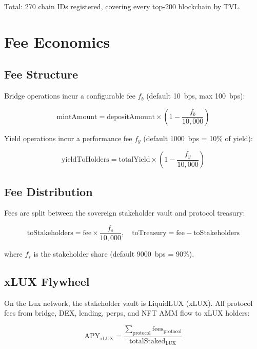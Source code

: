 \documentclass[11pt,twocolumn]{article}
\begin{document}
Total: 270 chain IDs registered, covering every top-200 blockchain by TVL.

\section{Fee Economics}

\subsection{Fee Structure}

Bridge operations incur a configurable fee $f_b$ (default 10~bps, max 100~bps):

\begin{equation}
  \text{mintAmount} = \text{depositAmount} \times \left(1 - \frac{f_b}{10{,}000}\right)
\end{equation}

Yield operations incur a performance fee $f_y$ (default 1000~bps = 10\% of yield):

\begin{equation}
  \text{yieldToHolders} = \text{totalYield} \times \left(1 - \frac{f_y}{10{,}000}\right)
\end{equation}

\subsection{Fee Distribution}

Fees are split between the sovereign stakeholder vault and protocol treasury:

\begin{equation}
  \text{toStakeholders} = \text{fee} \times \frac{f_s}{10{,}000}, \quad
  \text{toTreasury} = \text{fee} - \text{toStakeholders}
\end{equation}

where $f_s$ is the stakeholder share (default 9000~bps = 90\%).

\subsection{xLUX Flywheel}

On the Lux network, the stakeholder vault is LiquidLUX (xLUX). All protocol fees from bridge, DEX, lending, perps, and NFT AMM flow to xLUX holders:

\begin{equation}
  \text{APY}_{\text{xLUX}} = \frac{\sum_{\text{protocol}} \text{fees}_{\text{protocol}}}{\text{totalStaked}_{\text{LUX}}}
\end{equation}
\end{document}
